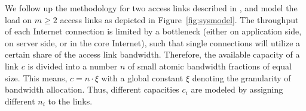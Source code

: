 




%

We follow up the methodology for two access links described in \cite{burger2016phycom}, and model the load on $m\geq 2$ access links as depicted in Figure~\ref{fig:sysmodel}. The throughput of each Internet connection is limited by a bottleneck (either on application side, on server side, or in the core Internet), such that single connections will utilize a certain share of the access link bandwidth. Therefore, the available capacity of a link $c$ is divided into a number $n$ of small atomic bandwidth fractions of equal size. This means, $c = n\cdot \xi$ with a global constant $\xi$ denoting the granularity of bandwidth allocation. Thus, different capacities $c_i$ are modeled by assigning different $n_i$ to the links.

